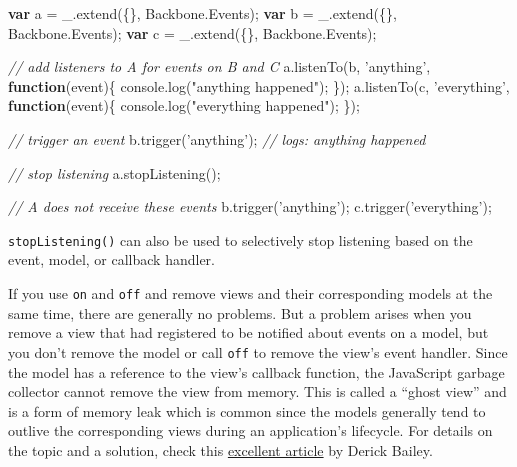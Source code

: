 \documentclass[9pt]{book}
\newenvironment{Shaded}{}{}
\newcommand{\KeywordTok}[1]{\textcolor[rgb]{0.00,0.44,0.13}{\textbf{{#1}}}}
\newcommand{\StringTok}[1]{\textcolor[rgb]{0.25,0.44,0.63}{{#1}}}
\newcommand{\CommentTok}[1]{\textcolor[rgb]{0.38,0.63,0.69}{\textit{{#1}}}}
\newcommand{\OtherTok}[1]{\textcolor[rgb]{0.00,0.44,0.13}{{#1}}}
\newcommand{\FunctionTok}[1]{\textcolor[rgb]{0.02,0.16,0.49}{{#1}}}
\newcommand{\NormalTok}[1]{{#1}}
\begin{document}
\begin{Shaded}
\begin{Highlighting}[]
\KeywordTok{var} \NormalTok{a = }\OtherTok{_}\NormalTok{.}\FunctionTok{extend}\NormalTok{(\{\}, }\OtherTok{Backbone}\NormalTok{.}\FunctionTok{Events}\NormalTok{);}
\KeywordTok{var} \NormalTok{b = }\OtherTok{_}\NormalTok{.}\FunctionTok{extend}\NormalTok{(\{\}, }\OtherTok{Backbone}\NormalTok{.}\FunctionTok{Events}\NormalTok{);}
\KeywordTok{var} \NormalTok{c = }\OtherTok{_}\NormalTok{.}\FunctionTok{extend}\NormalTok{(\{\}, }\OtherTok{Backbone}\NormalTok{.}\FunctionTok{Events}\NormalTok{);}

\CommentTok{// add listeners to A for events on B and C}
\OtherTok{a}\NormalTok{.}\FunctionTok{listenTo}\NormalTok{(b, }\StringTok{'anything'}\NormalTok{, }\KeywordTok{function}\NormalTok{(event)\{ }\OtherTok{console}\NormalTok{.}\FunctionTok{log}\NormalTok{(}\StringTok{"anything happened"}\NormalTok{); \});}
\OtherTok{a}\NormalTok{.}\FunctionTok{listenTo}\NormalTok{(c, }\StringTok{'everything'}\NormalTok{, }\KeywordTok{function}\NormalTok{(event)\{ }\OtherTok{console}\NormalTok{.}\FunctionTok{log}\NormalTok{(}\StringTok{"everything happened"}\NormalTok{); \});}

\CommentTok{// trigger an event}
\OtherTok{b}\NormalTok{.}\FunctionTok{trigger}\NormalTok{(}\StringTok{'anything'}\NormalTok{); }\CommentTok{// logs: anything happened}

\CommentTok{// stop listening}
\OtherTok{a}\NormalTok{.}\FunctionTok{stopListening}\NormalTok{();}

\CommentTok{// A does not receive these events}
\OtherTok{b}\NormalTok{.}\FunctionTok{trigger}\NormalTok{(}\StringTok{'anything'}\NormalTok{);}
\OtherTok{c}\NormalTok{.}\FunctionTok{trigger}\NormalTok{(}\StringTok{'everything'}\NormalTok{);}
\end{Highlighting}
\end{Shaded}

\texttt{stopListening()} can also be used to selectively stop listening
based on the event, model, or callback handler.

If you use \texttt{on} and \texttt{off} and remove views and their
corresponding models at the same time, there are generally no problems.
But a problem arises when you remove a view that had registered to be
notified about events on a model, but you don't remove the model or call
\texttt{off} to remove the view's event handler. Since the model has a
reference to the view's callback function, the JavaScript garbage
collector cannot remove the view from memory. This is called a ``ghost
view'' and is a form of memory leak which is common since the models
generally tend to outlive the corresponding views during an
application's lifecycle. For details on the topic and a solution, check
this
\href{http://lostechies.com/derickbailey/2011/09/15/zombies-run-managing-page-transitions-in-backbone-apps/}{excellent
article} by Derick Bailey.
\end{document}
